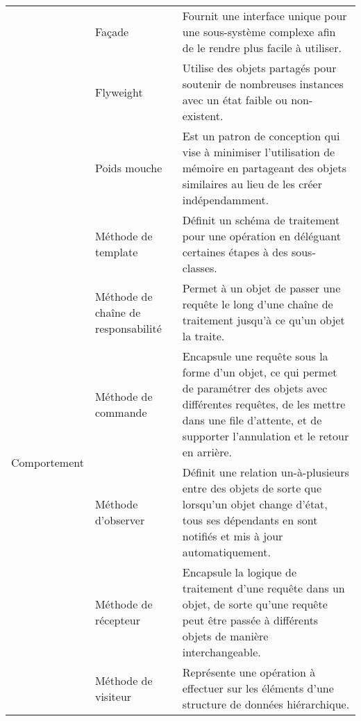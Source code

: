 \begin{minipage}[t]{1\textwidth}
\begin{table}[H]
\begin{adjustbox}{max width=\textwidth}
\begin{tabular}{l|p{14em}|p{30em}}
\cmidrule(lr){2-3}
& Façade & Fournit une interface unique pour une sous-système complexe afin de le rendre plus facile à utiliser.\\
\cmidrule(lr){2-3}
& Flyweight & Utilise des objets partagés pour soutenir de nombreuses instances avec un état faible ou non-existent.\\
\cmidrule(lr){2-3}
& Poids mouche & Est un patron de conception qui vise à minimiser l'utilisation de mémoire en partageant des objets similaires au lieu de les créer indépendamment.\\
\midrule
\multirow{6}{*}{Comportement} & Méthode de template & Définit un schéma de traitement pour une opération en déléguant certaines étapes à des sous-classes.\\
\cmidrule(lr){2-3}
& Méthode de chaîne de responsabilité & Permet à un objet de passer une requête le long d'une chaîne de traitement jusqu'à ce qu'un objet la traite.\\
\cmidrule(lr){2-3}
& Méthode de commande & Encapsule une requête sous la forme d'un objet, ce qui permet de paramétrer des objets avec différentes requêtes, de les mettre dans une file d'attente, et de supporter l'annulation et le retour en arrière.\\
\cmidrule(lr){2-3}
& Méthode d'observer & Définit une relation un-à-plusieurs entre des objets de sorte que lorsqu'un objet change d'état, tous ses dépendants en sont notifiés et mis à jour automatiquement.\\
\cmidrule(lr){2-3}
& Méthode de récepteur & Encapsule la logique de traitement d'une requête dans un objet, de sorte qu'une requête peut être passée à différents objets de manière interchangeable.\\
\cmidrule(lr){2-3}
& Méthode de visiteur & Représente une opération à effectuer sur les éléments d'une structure de données hiérarchique.\\
\bottomrule
\end{tabular}
\end{adjustbox}
\end{table}
\end{minipage}


\newpage
